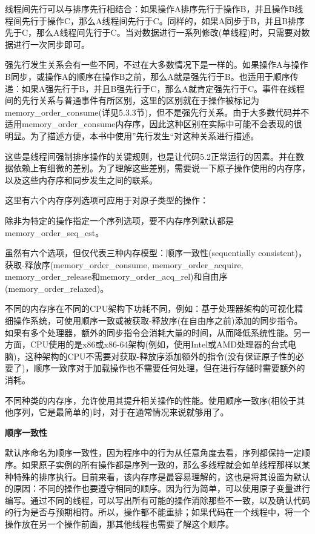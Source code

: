 线程间先行可以与排序先行相结合：如果操作A排序先行于操作B，并且操作B线程间先行于操作C，那么A线程间先行于C。同样的，如果A同步于B，并且B排序先于C，那么A线程间先行于C。当对数据进行一系列修改(单线程)时，只需要对数据进行一次同步即可。

强先行发生关系会有一些不同，不过在大多数情况下是一样的。如果操作A与操作B同步，或操作A的顺序在操作B之前，那么A就是强先行于B。也适用于顺序传递：如果A强先行于B，并且B强先行于C，那么A就肯定强先行于C。事件在线程间的先行关系与普通事件有所区别，这里的区别就在于操作被标记为memory\_order\_consume(详见5.3.3节)，但不是强先行关系。由于大多数代码并不适用memory\_order\_consume内存序，因此这种区别在实际中可能不会表现的很明显。为了描述方便，本书中使用”先行发生“对这种关系进行描述。

这些是线程间强制排序操作的关键规则，也是让代码5.2正常运行的因素。并在数据依赖上有细微的差别。为了理解这些差别，需要说一下原子操作使用的内存序，以及这些内存序和同步发生之间的联系。


这里有六个内存序列选项可应用于对原子类型的操作：


除非为特定的操作指定一个序列选项，要不内存序列默认都是memory\_order\_seq\_cst。

虽然有六个选项，但仅代表三种内存模型：顺序一致性(sequentially consistent)，获取-释放序(memory\_order\_consume, memory\_order\_acquire, memory\_order\_release和memory\_order\_acq\_rel)和自由序(memory\_order\_relaxed)。

不同的内存序在不同的CPU架构下功耗不同，例如：基于处理器架构的可视化精细操作系统，可使用顺序一致或被获取-释放序(在自由序之前)添加的同步指令。如果有多个处理器，额外的同步指令会消耗大量的时间，从而降低系统性能。另一方面，CPU使用的是x86或x86-64架构(例如，使用Intel或AMD处理器的台式电脑)，这种架构的CPU不需要对获取-释放序添加额外的指令(没有保证原子性的必要了)，顺序一致序对于加载操作也不需要任何处理，但在进行存储时需要额外的消耗。

不同种类的内存序，允许使用其提升相关操作的性能。使用顺序一致序(相较于其他序列，它是最简单的)时，对于在通常情况来说就够用了。

\textbf{顺序一致性}

默认序命名为顺序一致性，因为程序中的行为从任意角度去看，序列都保持一定顺序。如果原子实例的所有操作都是序列一致的，那么多线程就会如单线程那样以某种特殊的排序执行。目前来看，该内存序是最容易理解的，这也是将其设置为默认的原因：不同的操作也要遵守相同的顺序。因为行为简单，可以使用原子变量进行编写。通过不同的线程，可以写出所有可能的操作消除那些不一致，以及确认代码的行为是否与预期相符。所以，操作都不能重排；如果代码在一个线程中，将一个操作放在另一个操作前面，那其他线程也需要了解这个顺序。


